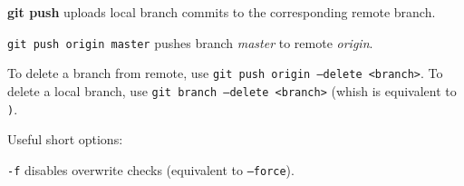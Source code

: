 %

\textbf{git push} uploads local branch commits to the corresponding remote branch.

\texttt{git push origin master} pushes branch \emph{master} to remote \emph{origin}.

To delete a branch from remote, use \texttt{git push origin --delete <branch>}.
To delete a local branch, use \texttt{git branch --delete <branch>} (whish is equivalent to \texttt).

Useful short options:
\begin{compactenum}
\item [\texttt{-f}] disables overwrite checks (equivalent to \texttt{--force}).
\end{compactenum}

%
